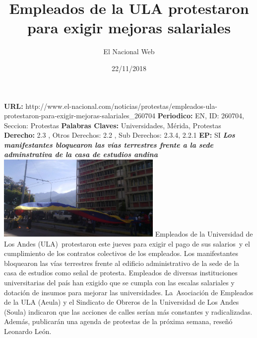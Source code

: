 \documentclass{article}%
\title{\textbf{Empleados de la ULA protestaron para exigir mejoras salariales}}%
\author{El Nacional Web}%
\date{22/11/2018}%
\begin{document}
%
\normalsize%
\maketitle%
\textbf{URL: }%
http://www.el{-}nacional.com/noticias/protestas/empleados{-}ula{-}protestaron{-}para{-}exigir{-}mejoras{-}salariales\_260704\newline%
%
\textbf{Periodico: }%
EN, %
ID: %
260704, %
Seccion: %
Protestas\newline%
%
\textbf{Palabras Claves: }%
Universidades, Mérida, Protestas\newline%
%
\textbf{Derecho: }%
2.3%
, Otros Derechos: %
2.2%
, Sub Derechos: %
2.3.4, 2.2.1%
\newline%
%
\textbf{EP: }%
SI\newline%
\newline%
%
\textbf{\textit{Los manifestantes bloquearon las vías terrestres frente a la sede adminstrativa de la casa de estudios andina}}%
\newline%
\newline%
%
\includegraphics[width=300px]{74.jpg}%
\newline%
%
Empleados de la Universidad de Los Andes (ULA)~protestaron este jueves para exigir el pago de sus salarios~y el cumplimiento de los contratos colectivos de los empleados.%
\newline%
%
Los manifestantes bloquearon las vías terrestres frente al edificio administrativo de la sede de la casa de estudios como señal de protesta.%
\newline%
%
Empleados de diversas instituciones universitarias del país han exigido que se cumpla con las escalas salariales y dotación de insumos para mejorar las universidades.%
\newline%
%
La~Asociación de Empleados de la ULA (Aeula) y el Sindicato de Obreros de la Universidad de Los Andes (Soula) indicaron que las acciones de calles serían más constantes y radicalizadas. Además, publicarán una agenda de protestas de la próxima semana, reseñó Leonardo León.%
\newline%
%
\end{document}
